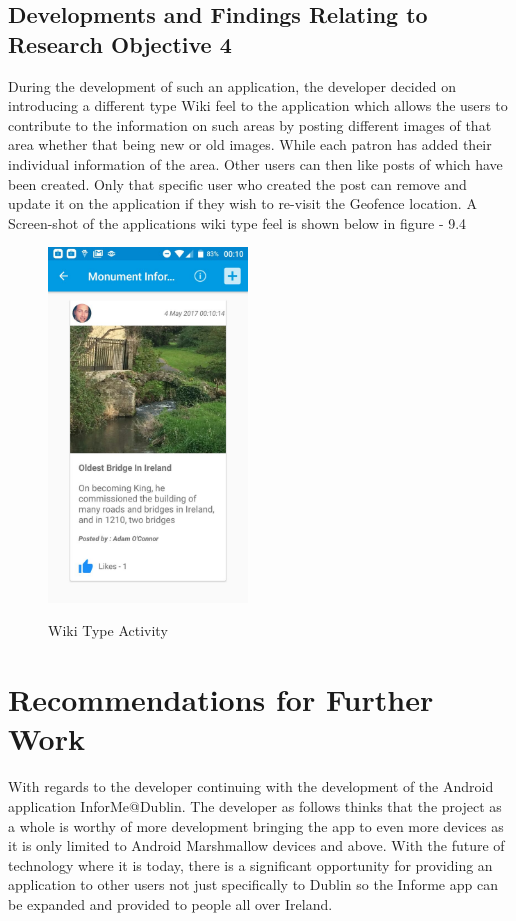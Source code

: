 \subsection{Developments and Findings Relating to Research Objective 4}
During the development of such an application, the developer decided on introducing a different type Wiki feel to the application which allows the users to contribute to the information on such areas by posting different images of that area whether that being new or old images. While each patron has added their individual information of the area. Other users can then like posts of which have been created. Only that specific user who created the post can remove and update it on the application if they wish to re-visit the Geofence location. A Screen-shot of the applications wiki type feel is shown below in figure - 9.4

\begin{figure}[htbp]
    \center \includegraphics[width=150pt]{wikifeel}\\
    \caption{Wiki Type Activity} \label{Figure: Wiki Type Activity}
\end{figure}
\newpage

\section{Recommendations for Further Work}
With regards to the developer continuing with the development of the Android application InforMe@Dublin. The developer as follows thinks that the project as a whole is worthy of more development bringing the app to even more devices as it is only limited to Android Marshmallow devices and above. With the future of technology where it is today, there is a significant opportunity for providing an application to other users not just specifically to Dublin so the Informe app can be expanded and provided to people all over Ireland.

